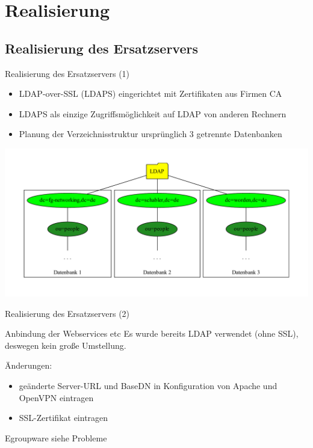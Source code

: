 \documentclass[handout,svgnames]{beamer}
\begin{document}
\section{Realisierung}
\subsection{Realisierung des Ersatzservers}
\begin{frame}{Realisierung des Ersatzservers (1)}
\begin{itemize}
	\item LDAP-over-SSL (LDAPS) eingerichtet mit Zertifikaten aus Firmen CA
	\item LDAPS als einzige Zugriffsmöglichkeit auf LDAP von anderen Rechnern
	\item Planung der Verzeichnisstruktur ursprünglich 3 getrennte Datenbanken
\end{itemize}
		\includegraphics[width=\textwidth]{Bilder/LDAP-fgn-planned.pdf}
\end{frame}


\begin{frame}{Realisierung des Ersatzservers (2)}

\end{frame}


\begin{frame}{Anbindung der Webservices etc}
Es wurde bereits LDAP verwendet (ohne SSL), deswegen kein große Umstellung.

Änderungen:
\begin{itemize}
	\item geänderte Server-URL und BaseDN in Konfiguration von Apache und OpenVPN eintragen
	\item SSL-Zertifikat eintragen
\end{itemize}
Egroupware siehe Probleme
\end{frame}
\end{document}
